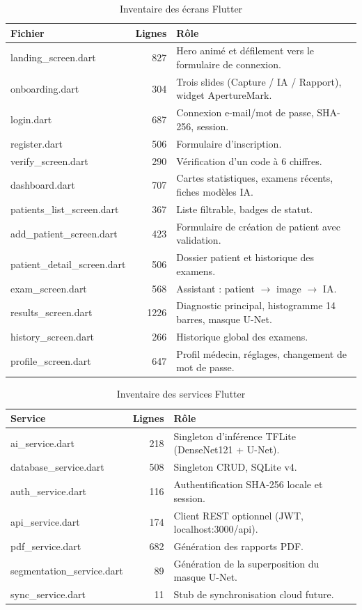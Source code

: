 \documentclass[12pt,a4paper]{report}
\begin{document}
\begin{table}[H]
\centering
\caption{Inventaire des écrans Flutter}
\label{tab:screens}
\begin{tabularx}{\textwidth}{l r X}
\toprule
\textbf{Fichier} & \textbf{Lignes} & \textbf{Rôle} \\
\midrule
landing\_screen.dart & 827 & Hero animé et défilement vers le formulaire de connexion. \\
onboarding.dart & 304 & Trois slides (Capture / IA / Rapport), widget ApertureMark. \\
login.dart & 687 & Connexion e-mail/mot de passe, SHA-256, session. \\
register.dart & 506 & Formulaire d'inscription. \\
verify\_screen.dart & 290 & Vérification d'un code à 6 chiffres. \\
dashboard.dart & 707 & Cartes statistiques, examens récents, fiches modèles IA. \\
patients\_list\_screen.dart & 367 & Liste filtrable, badges de statut. \\
add\_patient\_screen.dart & 423 & Formulaire de création de patient avec validation. \\
patient\_detail\_screen.dart & 506 & Dossier patient et historique des examens. \\
exam\_screen.dart & 568 & Assistant : patient $\rightarrow$ image $\rightarrow$ IA. \\
results\_screen.dart & 1226 & Diagnostic principal, histogramme 14 barres, masque U-Net. \\
history\_screen.dart & 266 & Historique global des examens. \\
profile\_screen.dart & 647 & Profil médecin, réglages, changement de mot de passe. \\
\bottomrule
\end{tabularx}
\end{table}

\begin{table}[H]
\centering
\caption{Inventaire des services Flutter}
\label{tab:services}
\begin{tabularx}{\textwidth}{l r X}
\toprule
\textbf{Service} & \textbf{Lignes} & \textbf{Rôle} \\
\midrule
ai\_service.dart & 218 & Singleton d'inférence TFLite (DenseNet121 + U-Net). \\
database\_service.dart & 508 & Singleton CRUD, SQLite v4. \\
auth\_service.dart & 116 & Authentification SHA-256 locale et session. \\
api\_service.dart & 174 & Client REST optionnel (JWT, localhost:3000/api). \\
pdf\_service.dart & 682 & Génération des rapports PDF. \\
segmentation\_service.dart & 89 & Génération de la superposition du masque U-Net. \\
sync\_service.dart & 11 & Stub de synchronisation cloud future. \\
\bottomrule
\end{tabularx}
\end{table}
\end{document}
